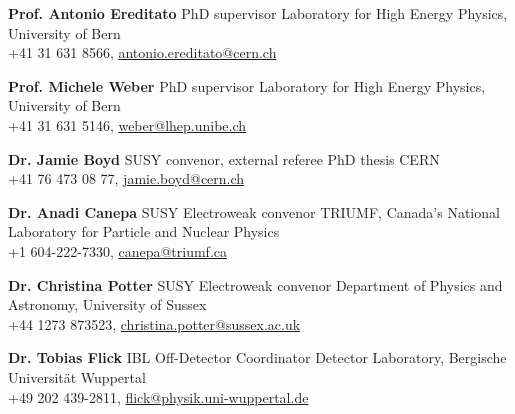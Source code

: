 \documentclass[]{cv} %
\begin{document}
\begin{entrylist}

  \entry
  {}
  {\textbf{Prof. Antonio Ereditato}}
  {PhD supervisor}
  {Laboratory for High Energy Physics, University of Bern\\+41 31 631 8566, \href{mailto:antonio.ereditato@cern.ch}{antonio.ereditato@cern.ch}}

  \entry
  {}
  {\textbf{Prof. Michele Weber}}
  {PhD supervisor}
  {Laboratory for High Energy Physics, University of Bern\\+41 31 631 5146, \href{mailto:weber@lhep.unibe.ch}{weber@lhep.unibe.ch}}

  \entry
  {}
  {\textbf{Dr. Jamie Boyd}}
  {SUSY convenor, external referee PhD thesis}
  {CERN\\+41 76 473 08 77, \href{mailto:jamie.boyd@cern.ch}{jamie.boyd@cern.ch}}

  \entry
  {}
  {\textbf{Dr. Anadi Canepa}}
  {SUSY Electroweak convenor}
  {TRIUMF, Canada's National Laboratory for Particle and Nuclear Physics\\+1 604-222-7330, \href{mailto:canepa@triumf.ca}{canepa@triumf.ca}}

  \entry
  {}
  {\textbf{Dr. Christina Potter}}
  {SUSY Electroweak convenor}
  {Department of Physics and Astronomy, University of Sussex\\+44 1273 873523, \href{mailto:christina.potter@sussex.ac.uk}{christina.potter@sussex.ac.uk}}

  \entry
  {}
  {\textbf{Dr. Tobias Flick}}
  {IBL Off-Detector Coordinator}
  {Detector Laboratory, Bergische Universit{\"a}t Wuppertal\\+49 202 439-2811, \href{mailto:flick@physik.uni-wuppertal.de}{flick@physik.uni-wuppertal.de}}

\end{entrylist}
\end{document}
